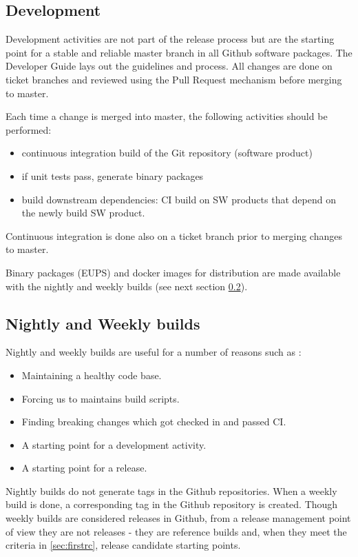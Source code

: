 \subsection{Development} \label{sec:dev}

Development activities are not part of the release process but are the starting point for a stable and reliable master branch in all Github software packages.
The Developer Guide lays out the guidelines and process. All changes are done on ticket branches and reviewed using the Pull Request mechanism before merging to master.

Each time a change is merged into master, the following activities should be performed:

\begin{itemize}
\item continuous integration build of the Git repository (software product)
\item if unit tests pass, generate binary packages
\item build downstream dependencies: CI build on SW products that depend on the newly build SW product.
\end{itemize}

Continuous integration is done also on a ticket branch prior to merging changes to master. 

Binary packages (EUPS) and docker images for distribution are made available with the nightly and weekly builds (see next section \ref{sec:weekly}).


\subsection{Nightly and Weekly builds} \label{sec:weekly}

Nightly and weekly builds are  useful for a number of reasons such as :
\begin{itemize}
	\item Maintaining a healthy code base.
	\item Forcing us to maintains build scripts.
	\item Finding breaking changes which got checked in and passed CI.
	\item A starting point for a development activity.
	\item A starting point for a release.
\end{itemize}

Nightly builds do not generate tags in the Github repositories.
When a weekly build is done, a corresponding tag in the Github repository is created.
Though weekly builds are considered releases in Github, from a release management point of view they are not
releases - they are reference builds and, when they meet the criteria in \ref{sec:firstrc}, release candidate starting points.


